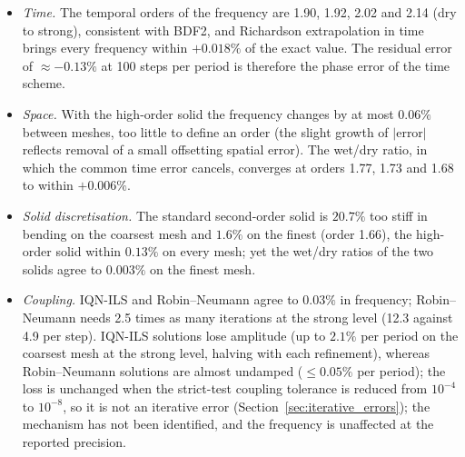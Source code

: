 \begin{itemize}
	\item \emph{Time.} The temporal orders of the frequency are 1.90, 1.92, 2.02 and 2.14 (dry to strong), consistent with BDF2, and Richardson extrapolation in time brings every frequency within $+0.018\%$ of the exact value. The residual error of $\approx-0.13\%$ at 100 steps per period is therefore the phase error of the time scheme.
	\item \emph{Space.} With the high-order solid the frequency changes by at most $0.06\%$ between meshes, too little to define an order (the slight growth of $|\text{error}|$ reflects removal of a small offsetting spatial error). The wet/dry ratio, in which the common time error cancels, converges at orders 1.77, 1.73 and 1.68 to within $+0.006\%$.
	\item \emph{Solid discretisation.} The standard second-order solid is $20.7\%$ too stiff in bending on the coarsest mesh and $1.6\%$ on the finest (order 1.66), the high-order solid within $0.13\%$ on every mesh; yet the wet/dry ratios of the two solids agree to $0.003\%$ on the finest mesh.
	\item \emph{Coupling.} IQN-ILS and Robin--Neumann agree to $0.03\%$ in frequency; Robin--Neumann needs 2.5 times as many iterations at the strong level (12.3 against 4.9 per step). IQN-ILS solutions lose amplitude (up to $2.1\%$ per period on the coarsest mesh at the strong level, halving with each refinement), whereas Robin--Neumann solutions are almost undamped ($\leq0.05\%$ per period); the loss is unchanged when the strict-test coupling tolerance is reduced from $10^{-4}$ to $10^{-8}$, so it is not an iterative error (Section~\ref{sec:iterative_errors}); the mechanism has not been identified, and the frequency is unaffected at the reported precision.
\end{itemize}


